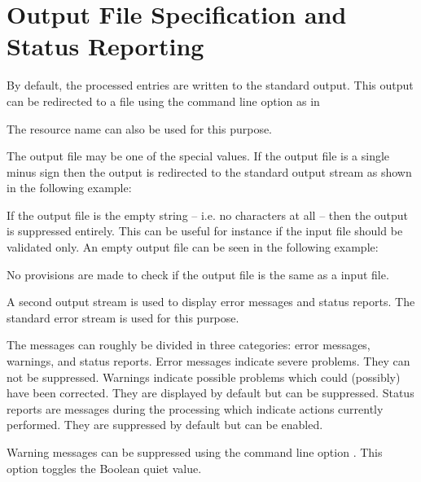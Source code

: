 \documentclass[11pt,a4paper]{scrbook}
\begin{document}
\section{Output File Specification and Status Reporting}

By default, the processed \BibTeX{} entries are written to the standard
output. This output can be redirected to a file using the command line option
 as in


The resource name  can also be used for this purpose.

\begin{Resources}
\end{Resources}

The output file may be one of the special values. If the output file is a
single minus sign then the output is redirected to the standard output stream
as shown in the following example:

\begin{Resources}
\end{Resources}

If the output file is the empty string -- i.e. no characters at all -- then
the output is suppressed entirely. This can be useful for instance if the
input file should be validated only. An empty output file can be seen in the
following example:

\begin{Resources}
\end{Resources}

No provisions are made to check if the output file is the same as a input
file.

A second output stream is used to display error messages and status reports.
The standard error stream is used for this purpose.

The messages can roughly be divided in three categories: error messages,
warnings, and status reports. Error messages indicate severe problems. They
can not be suppressed. Warnings indicate possible problems which could
(possibly) have been corrected. They are displayed by default but can be
suppressed. Status reports are messages during the processing which indicate
actions currently performed. They are suppressed by default but can be
enabled.

Warning messages can be suppressed using the command line option .
This option toggles the Boolean quiet value.
\end{document}
